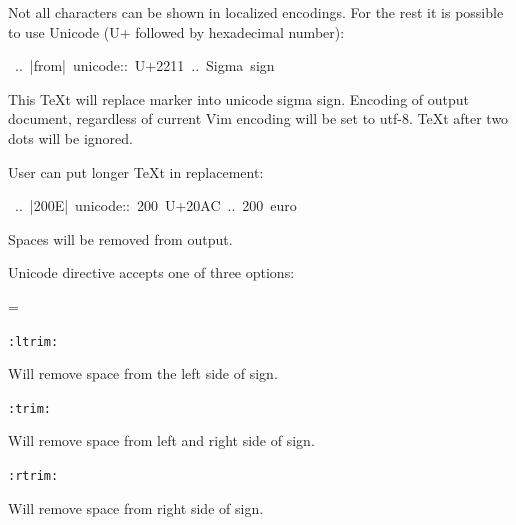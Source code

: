 \documentclass[12pt]{article}
\newenvironment{deflist}[1]{%
\begin{list}{}
{\renewcommand{\makelabel}[1]{\textbf{##1}\hfill}
\settowidth{\labelwidth}{\textbf{#1}}
\leftmargin=\labelwidth
\advance \leftmargin\labelsep}}
{\end{list}}
\begin{document}
Not all characters can be shown in localized encodings. For the rest it is
possible to use Unicode (U+ followed by hexadecimal number):

\begin{ttfamily}\begin{flushleft}
\mbox{~..~|from|~unicode::~U+2211~..~Sigma~sign}\\
\end{flushleft}\end{ttfamily}

This \TeX{}t will replace marker into unicode sigma sign. Encoding of output
document, regardless of current Vim encoding will be set to utf-8. \TeX{}t after
two dots will be ignored.

User can put longer \TeX{}t in replacement:

\begin{ttfamily}\begin{flushleft}
\mbox{~..~|200E|~unicode::~200~U+20AC~..~200~euro}\\
\end{flushleft}\end{ttfamily}

Spaces will be removed from output.

Unicode directive accepts one of three options:

\begin{deflist}{iii}

\item[\texttt{:ltrim:}]

Will remove space from the left side of sign.

\item[\texttt{:trim:}]

Will remove space from left and right side of sign.

\item[\texttt{:rtrim:}]

Will remove space from right side of sign.
\end{deflist}
\begin{center}
\end{center}
\hypertarget{ldate}{}
\end{document}
